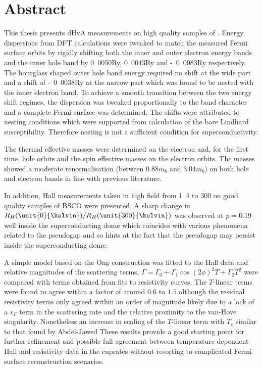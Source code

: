 \thispagestyle{empty}\null\clearpage

\setcounter{page}{1}


\section*{Abstract}


This thesis presents \ac{dHvA} measurements on high quality samples of \BaFeP{}. Energy dispersions from \ac{DFT} calculations were tweaked to match the measured Fermi surface orbits by rigidly shifting both the inner and outer electron energy bands and the inner hole band by \unit{0.0050}{\textrm{Ry}}, \unit{0.0043}{\textrm{Ry}} and \unit{-0.0083}{\textrm{Ry}} respectively. The hourglass shaped outer hole band energy required no shift at the wide part and a shift of \unit{-0.0038}{\textrm{Ry}} at the narrow part which was found to be nested with the inner electron band. To achieve a smooth transition between the two energy shift regimes, the dispersion was tweaked proportionally to the \DzTwo{} band character and a complete Fermi surface was determined. The shifts were attributed to nesting conditions which were supported from calculation of the bare Lindhard susceptibility. Therefore nesting is not a sufficient condition for superconductivity.

The thermal effective masses were determined on the electron and, for the first time, hole orbits and the spin effective masses on the electron orbits. The masses showed a moderate renormalisation (between $\unit{0.88}{m_b}$ and $\unit{3.04}{m_b}$) on both hole and electron bands in line with previous literature.

In addition, Hall measurements taken in high field from \unit{1.4}{\kelvin} to \unit{300}{\kelvin} on good quality samples of \ac{BSCO} were presented. A sharp change in $R_H(\unit{0}{\kelvin})/R_H(\unit{300}{\kelvin})$ was observed at $p=0.19$ well inside the superconducting dome which coincides with various phenomena related to the pseudogap and so hints at the fact that the pseudogap may persist inside the superconducting dome.


A simple model based on the Ong construction was fitted to the Hall data and relative magnitudes of the scattering terms, $\Gamma = \Gamma_0 + \Gamma_1 \cos(2\phi)^2 T + \Gamma_2 T^2$ were compared with terms obtained from fits to resistivity curves. The $T$-linear terms were found to agree within a factor of around $0.6$ to $1.5$ although the residual resistivity terms only agreed within an order of magnitude likely due to a lack of a $v_F$ term in the scattering rate and the relative proximity to the van-Hove singularity. Nonetheless an increase in scaling of the $T$-linear term with $T_c$ similar to that found by Abdel-Jawed \etal These results provide a good starting point for further refinement and possible full agreement between temperature dependent Hall and resistivity data in the cuprates without resorting to complicated Fermi surface reconstruction scenarios.

